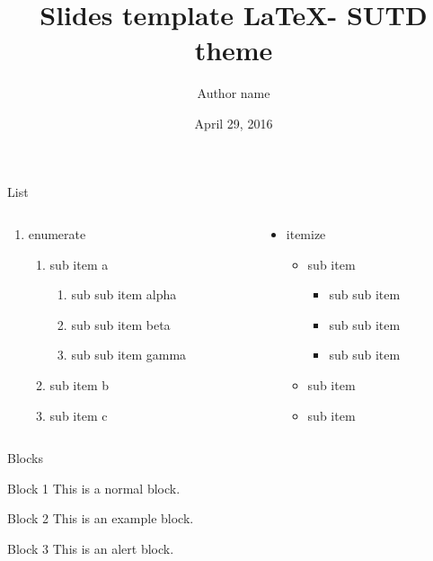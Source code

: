 \documentclass[presentation, aspectratio=54]{beamer}
\author{Author name}
\date{April 29, 2016}
\title[short title]{Slides template \LaTeX - SUTD theme}
\begin{document}
\maketitle

\begin{frame}{List}

\begin{columns}
\begin{column}{0.5\textwidth}
\begin{enumerate}
\item \alert{enumerate}
  \begin{enumerate}
  \item sub item a
    \begin{enumerate}
    \item sub sub item alpha
    \item sub sub item beta
    \item sub sub item gamma
    \end{enumerate}
  \item sub item b
  \item sub item c
  \end{enumerate}
\end{enumerate}
\end{column}

\begin{column}{0.5\textwidth}
\begin{itemize}
\item \alert{itemize}
  \begin{itemize}
  \item sub item
    \begin{itemize}
    \item sub sub item
    \item sub sub item
    \item sub sub item
    \end{itemize}
  \item sub item
  \item sub item
  \end{itemize}
\end{itemize}

\end{column}
\end{columns}

\end{frame}

\begin{frame}{Blocks}
\begin{block}{Block 1}
This is a normal block.
\end{block}
\begin{exampleblock}{Block 2}
This is an example block.
\end{exampleblock}
\begin{alertblock}{Block 3}
This is an alert block.
\end{alertblock}
\end{frame}
\end{document}
